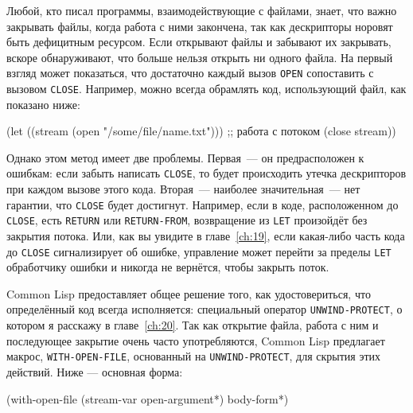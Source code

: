 Любой, кто писал программы, взаимодействующие с файлами, знает, что важно закрывать файлы,
когда работа с ними закончена, так как дескрипторы норовят быть дефицитным ресурсом. Если
открывают файлы и забывают их закрывать, вскоре обнаруживают, что больше нельзя открыть ни
одного файла. На первый взгляд может показаться, что достаточно каждый вызов \lstinline{OPEN}
сопоставить с вызовом \lstinline{CLOSE}. Например, можно всегда обрамлять код, использующий
файл, как показано ниже:

\begin{myverb}
(let ((stream (open "/some/file/name.txt"))) 
  ;; работа с потоком
  (close stream)) 
\end{myverb}

Однако этом метод имеет две проблемы. Первая~--- он предрасположен к ошибкам: если забыть
написать \lstinline{CLOSE}, то будет происходить утечка дескрипторов при каждом вызове этого
кода. Вторая~--- наиболее значительная~--- нет гарантии, что \lstinline{CLOSE} будет
достигнут. Например, если в коде, расположенном до \lstinline{CLOSE}, есть \lstinline{RETURN} или
\lstinline{RETURN-FROM}, возвращение из \lstinline{LET} произойдёт без закрытия потока. Или, как вы
увидите в главе~\ref{ch:19}, если какая-либо часть кода до \lstinline{CLOSE} сигнализирует об
ошибке, управление может перейти за пределы \lstinline{LET} обработчику ошибки и никогда не
вернётся, чтобы закрыть поток.

Common Lisp предоставляет общее решение того, как удостовериться, что определённый код
всегда исполняется: специальный оператор \lstinline{UNWIND-PROTECT}, о котором я расскажу в
главе~\ref{ch:20}. Так как открытие файла, работа с ним и последующее закрытие очень часто
употребляются, Common Lisp предлагает макрос, \lstinline{WITH-OPEN-FILE}, основанный на
\lstinline{UNWIND-PROTECT}, для скрытия этих действий. Ниже — основная форма:

\begin{myverb}
(with-open-file (stream-var open-argument*) 
  body-form*) 
\end{myverb}

